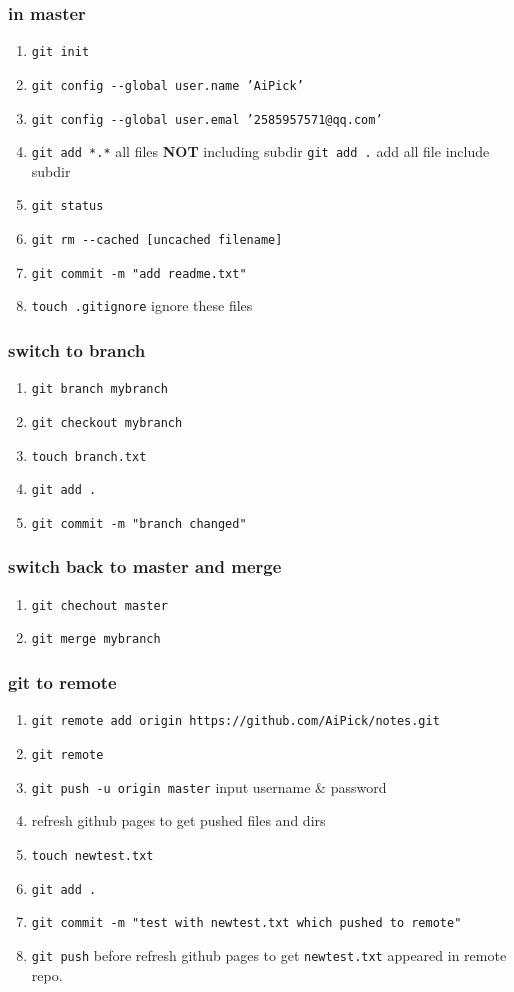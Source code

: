 \documentclass[11pt]{article}
\begin{document}
\subsubsection{in master}
\label{sec:orgf6342ef}
\begin{enumerate}
\item \texttt{git init}
\item \texttt{git config -{}-global user.name 'AiPick'}
\item \texttt{git config -{}-global user.emal '2585957571@qq.com'}
\item \texttt{git add *.*} all files \textbf{NOT} including subdir
\texttt{git add .}  add all file include subdir
\item \texttt{git status}
\item \texttt{git rm -{}-cached [uncached filename]}
\item \texttt{git commit -m "add readme.txt"}
\item \texttt{touch .gitignore} ignore these files
\end{enumerate}
\subsubsection{switch to branch}
\label{sec:org4d42c40}
\begin{enumerate}
\item \texttt{git branch mybranch}
\item \texttt{git checkout mybranch}
\item \texttt{touch branch.txt}
\item \texttt{git add .}
\item \texttt{git commit -m "branch changed"}
\end{enumerate}
\subsubsection{switch back to master and merge}
\label{sec:org2c3c86c}
\begin{enumerate}
\item \texttt{git chechout master}
\item \texttt{git merge mybranch}
\end{enumerate}
\subsubsection{git to remote}
\label{sec:org2ee77ff}
\begin{enumerate}
\item \texttt{git remote add origin https://github.com/AiPick/notes.git}
\item \texttt{git remote}
\item \texttt{git push -u origin master}
input username \& password
\item refresh github pages to get pushed files and dirs
\item \texttt{touch newtest.txt}
\item \texttt{git add .}
\item \texttt{git commit -m "test with newtest.txt which pushed to remote"}
\item \texttt{git push} before refresh github pages to get \texttt{newtest.txt} appeared in remote repo.
\end{enumerate}
\end{document}
